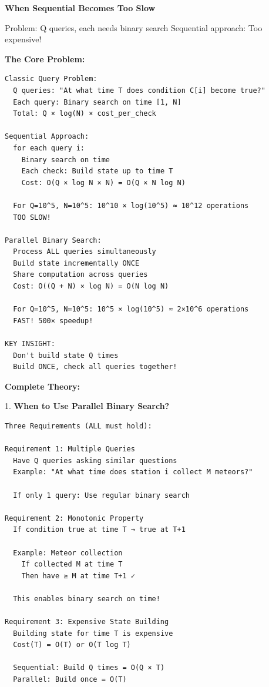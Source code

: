 \documentclass[11pt,a4paper,oneside]{book}
\begin{document}
\begin{tcolorbox}[
    enhanced,breakable,
    colback=white,
    colframe=deepblue,
    boxrule=1.5pt,
    arc=3mm,
    title=\textbf{The Offline Processing Paradigm}
]
\textbf{When Sequential Becomes Too Slow}

Problem: Q queries, each needs binary search
Sequential approach: Too expensive!

\textbf{The Core Problem:}
\begin{verbatim}
Classic Query Problem:
  Q queries: "At what time T does condition C[i] become true?"
  Each query: Binary search on time [1, N]
  Total: Q × log(N) × cost_per_check
  
Sequential Approach:
  for each query i:
    Binary search on time
    Each check: Build state up to time T
    Cost: O(Q × log N × N) = O(Q × N log N)
  
  For Q=10^5, N=10^5: 10^10 × log(10^5) ≈ 10^12 operations
  TOO SLOW!

Parallel Binary Search:
  Process ALL queries simultaneously
  Build state incrementally ONCE
  Share computation across queries
  Cost: O((Q + N) × log N) = O(N log N)
  
  For Q=10^5, N=10^5: 10^5 × log(10^5) ≈ 2×10^6 operations
  FAST! 500× speedup!

KEY INSIGHT:
  Don't build state Q times
  Build ONCE, check all queries together!
\end{verbatim}

\textbf{Complete Theory:}

1. \textbf{When to Use Parallel Binary Search?}
\begin{verbatim}
Three Requirements (ALL must hold):

Requirement 1: Multiple Queries
  Have Q queries asking similar questions
  Example: "At what time does station i collect M meteors?"
  
  If only 1 query: Use regular binary search

Requirement 2: Monotonic Property
  If condition true at time T → true at T+1
  
  Example: Meteor collection
    If collected M at time T
    Then have ≥ M at time T+1 ✓
  
  This enables binary search on time!

Requirement 3: Expensive State Building
  Building state for time T is expensive
  Cost(T) = O(T) or O(T log T)
  
  Sequential: Build Q times = O(Q × T)
  Parallel: Build once = O(T)
  

\end{verbatim}
\end{tcolorbox}
\end{document}
